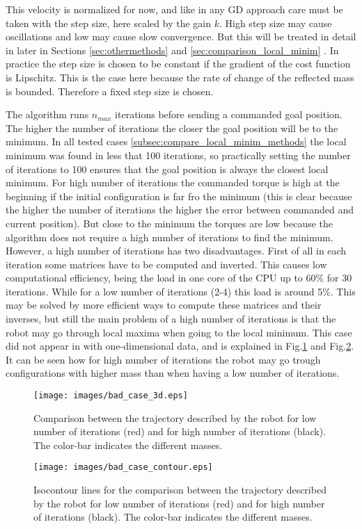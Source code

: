 This velocity is normalized for now, and like in any GD approach care must be taken with the step size, here scaled by the gain $k$. High step size may cause oscillations and low may cause slow convergence. But this will be treated in detail in later in Sections 	\ref{sec:othermethods} and \ref{sec:comparison_local_minim} .  In practice the step size is chosen to be constant if the gradient of the cost function is Lipschitz. This is the case here because the rate of change of the reflected mass is bounded. Therefore a fixed step size is chosen.

The algorithm runs $n_{max}$ iterations before sending a commanded goal position. 
The higher the number of iterations the closer the goal position will be to the  minimum. In all tested cases   \ref{subsec:compare_local_minim_methods}  the local minimum was found in less that 100 iterations, so practically setting the number of iterations to 100 ensures that the goal position is always the closest local minimum. For high number of iterations the commanded torque is high at the beginning if the initial configuration is far fro the minimum (this is clear because the higher the number of iterations the higher the error between commanded and current position).
But close to the minimum the torques are low because the algorithm does not require a high number of iterations to find the minimum. 
However, a high number of iterations has two disadvantages. First of all in each iteration some matrices have to be computed and inverted. This causes low computational efficiency, being the load in one core of the CPU up to 60\% for 30 iterations. While for a low number of iterations (2-4) this load is around 5\%. This may be solved by more efficient ways to compute these matrices and their inverses, but still the main problem of a high number of iterations is that the robot may go through local maxima when going to the local minimum.
This case did not appear in \cite{paper_iros2017} with one-dimensional data, and is explained in Fig.\ref{fig:bad_case_3d} and Fig.\ref{fig:bad_case_contour}. It can be seen how for high number of iterations the robot may go trough configurations with higher mass than when having a low number of iterations.

\begin{figure}[!htb]
	\centerline{
		\texttt{[image: images/bad\_case\_3d.eps]}}
	\caption{Comparison between the trajectory described by the robot for low number of iterations (red) and for high number of iterations (black). The color-bar indicates the different masses.}
	\label{fig:bad_case_3d}
\end{figure}
\begin{figure}[!htb]
	\centerline{
		\texttt{[image: images/bad\_case\_contour.eps]}}
	\caption{Isocontour lines for the comparison between the trajectory described by the robot for low number of iterations (red) and for high number of iterations (black). The color-bar indicates the different masses.}
	\label{fig:bad_case_contour}
\end{figure}

